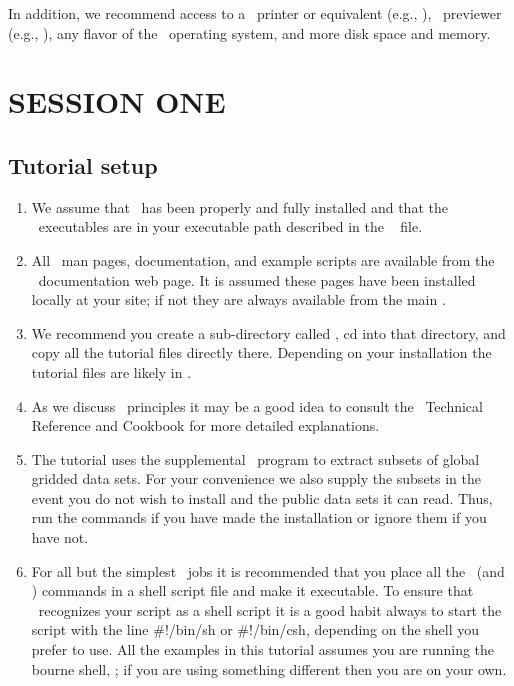 \documentclass[11pt]{report}
\begin{document}
In addition, we recommend access to a \PS\ printer or equivalent
(e.g., ), \PS\ previewer (e.g., ),
any flavor of the \UNIX\ operating system, and more disk space and memory.

\chapter{SESSION ONE} 

\section{Tutorial setup}
\begin{enumerate}

\item We assume that \GMT\ has been properly and fully
installed and that the \GMT\ executables are in your executable path
described in the \GMT\  file.

\item All \GMT\ man pages, documentation, and example scripts
are available from the \GMT\ documentation web page.  It is
assumed these pages have been installed locally at your site;
if not they are always available from the main
.

\item We recommend you create a sub-directory called ,
cd into that directory, and copy all the tutorial files directly
there. Depending on your installation the tutorial files are likely in .

\item As we discuss \GMT\ principles it may be a good idea to
consult the \GMT\ Technical Reference and Cookbook for more
detailed explanations.

\item The tutorial uses the supplemental \GMT\ program
 to extract subsets of global gridded data
sets.  For your convenience we also supply the subsets in the
event you do not wish to install  and the
public data sets it can read.  Thus, run the 
commands if you have made the installation or ignore them if
you have not.

\item For all but the simplest \GMT\ jobs it is recommended that
you place all the \GMT\ (and \UNIX) commands in a shell script
file and make it executable.  To ensure that \UNIX\ recognizes
your script as a shell script it is a good habit always to start
the script with the line \#!/bin/sh or \#!/bin/csh, depending on the shell you prefer to use.
All the examples in this tutorial assumes you are running the bourne shell, ; if you are using
something different then you are on your own.


\end{enumerate}
\end{document}

